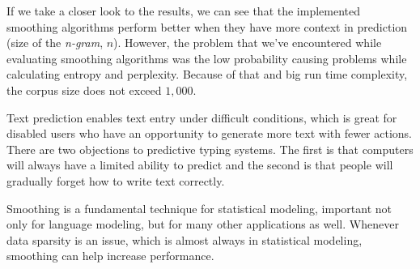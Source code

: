 \documentclass[10pt, a4paper]{article}
\begin{document}
If we take a closer look to the results, we can see that the implemented smoothing algorithms perform better when they have more context in prediction (size of the \textit{n-gram}, $n$). However, the problem that we\rq{}ve encountered while evaluating smoothing algorithms was the low probability causing problems while calculating entropy and perplexity. Because of that and big run time complexity, the corpus size does not exceed $1,000$.

Text prediction enables text entry under difficult conditions, which is great for disabled users who have an opportunity to generate more text with fewer actions. There are two objections to predictive typing systems. The first is that computers will always have a limited ability to predict and the second is that people will gradually forget how to write text correctly.

Smoothing is a fundamental technique for statistical modeling, important not only for language modeling, but for many other applications as well. Whenever data sparsity is an issue, which is almost always in statistical modeling, smoothing can help increase performance.

{} 
\nocite{*}

\end{document}
